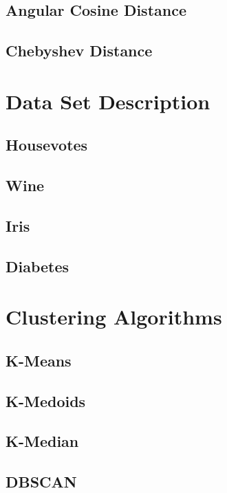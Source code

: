 \documentclass[12pt, english]
{article}
\begin{document}
\subsection{Angular Cosine Distance}


\subsection{Chebyshev Distance}


\section{Data Set Description}

\subsection{Housevotes} \label{housevotes}

\subsection{Wine}

\subsection{Iris}

\subsection{Diabetes} \label{diabetes}


\section{Clustering Algorithms} \label{algorithms}
\subsection{K-Means}

\subsection{K-Medoids}

\subsection{K-Median}

\subsection{DBSCAN}

\end{document}
